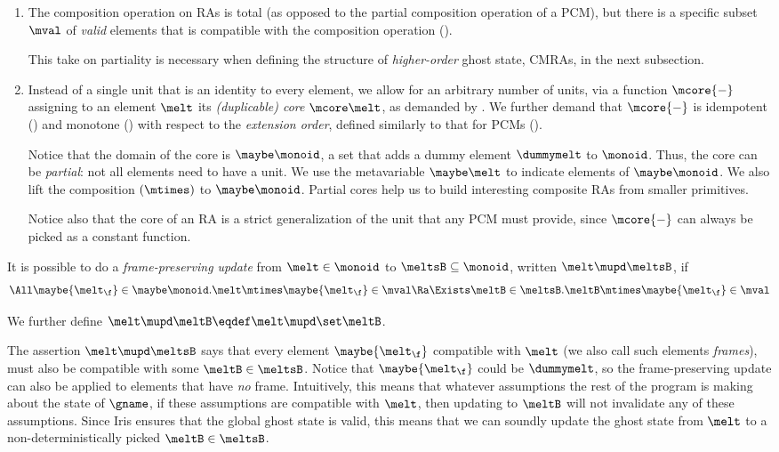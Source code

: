 \begin{enumerate}
\item The composition operation on RAs is total (as opposed to the partial composition operation of a PCM), but there is a specific subset $\mval$ of \emph{valid} elements that is compatible with the composition operation ().

This take on partiality is necessary when defining the structure of \emph{higher-order} ghost state, CMRAs, in the next subsection.

\item Instead of a single unit that is an identity to every element, we allow
for an arbitrary number of units, via a function $\mcore{{-}}$ assigning to an element $\melt$ its \emph{(duplicable) core} $\mcore\melt$, as demanded by .
  We further demand that $\mcore{{-}}$ is idempotent () and monotone () with respect to the \emph{extension order}, defined similarly to that for PCMs ().

  Notice that the domain of the core is $\maybe\monoid$, a set that adds a dummy element $\dummymelt$ to $\monoid$.
  Thus, the core can be \emph{partial}: not all elements need to have a unit.
  We use the metavariable $\maybe\melt$ to indicate elements of  $\maybe\monoid$.
  We also lift the composition $(\mtimes)$ to $\maybe\monoid$.
  Partial cores help us to build interesting composite RAs from smaller primitives.

Notice also that the core of an RA is a strict generalization of the unit that any PCM must provide, since $\mcore{{-}}$ can always be picked as a constant function.
\end{enumerate}


\begin{defn}
  It is possible to do a \emph{frame-preserving update} from $\melt \in \monoid$ to $\meltsB \subseteq \monoid$, written $\melt \mupd \meltsB$, if
  \[ \All \maybe{\melt_\f} \in \maybe\monoid. \melt \mtimes \maybe{\melt_\f} \in \mval \Ra \Exists \meltB \in \meltsB. \meltB \mtimes \maybe{\melt_\f} \in \mval \]

  We further define $\melt \mupd \meltB \eqdef \melt \mupd \set\meltB$.
\end{defn}
The assertion $\melt \mupd \meltsB$ says that every element $\maybe{\melt_\f}$ compatible with $\melt$ (we also call such elements \emph{frames}), must also be compatible with some $\meltB \in \meltsB$.
Notice that $\maybe{\melt_\f}$ could be $\dummymelt$, so the frame-preserving update can also be applied to elements that have \emph{no} frame.
Intuitively, this means that whatever assumptions the rest of the program is making about the state of $\gname$, if these assumptions are compatible with $\melt$, then updating to $\meltB$ will not invalidate any of these assumptions.
Since Iris ensures that the global ghost state is valid, this means that we can soundly update the ghost state from $\melt$ to a non-deterministically picked $\meltB \in \meltsB$.


